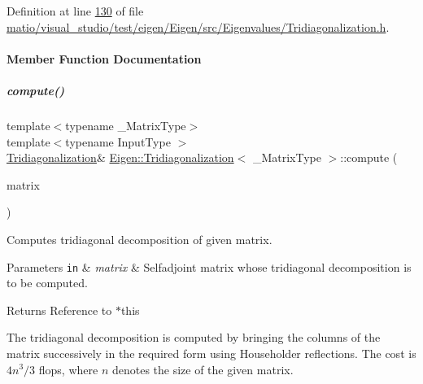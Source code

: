 Definition at line \hyperlink{matio_2visual__studio_2test_2eigen_2_eigen_2src_2_eigenvalues_2_tridiagonalization_8h_source_l00130}{130} of file \hyperlink{matio_2visual__studio_2test_2eigen_2_eigen_2src_2_eigenvalues_2_tridiagonalization_8h_source}{matio/visual\+\_\+studio/test/eigen/\+Eigen/src/\+Eigenvalues/\+Tridiagonalization.\+h}.



\paragraph{Member Function Documentation}
\mbox{\label{group___eigenvalues___module_acd288abb081d3b40b87e4b98cd8f6ee9}} 
\subparagraph{\texorpdfstring{compute()}{compute()}\hspace{0.1cm}{\footnotesize\ttfamily [1/2]}}
{\footnotesize\ttfamily template$<$typename \+\_\+\+Matrix\+Type$>$ \\
template$<$typename Input\+Type $>$ \\
\hyperlink{group___eigenvalues___module_class_eigen_1_1_tridiagonalization}{Tridiagonalization}\& \hyperlink{group___eigenvalues___module_class_eigen_1_1_tridiagonalization}{Eigen\+::\+Tridiagonalization}$<$ \+\_\+\+Matrix\+Type $>$\+::compute (\begin{DoxyParamCaption}\item[{const \hyperlink{group___core___module_struct_eigen_1_1_eigen_base}{Eigen\+Base}$<$ Input\+Type $>$ \&}]{matrix }\end{DoxyParamCaption})\hspace{0.3cm}{\ttfamily [inline]}}



Computes tridiagonal decomposition of given matrix. 


\begin{DoxyParams}[1]{Parameters}
\mbox{\tt in}  & {\em matrix} & Selfadjoint matrix whose tridiagonal decomposition is to be computed. \\
\hline
\end{DoxyParams}
\begin{DoxyReturn}{Returns}
Reference to {\ttfamily $\ast$this} 
\end{DoxyReturn}
The tridiagonal decomposition is computed by bringing the columns of the matrix successively in the required form using Householder reflections. The cost is $ 4n^3/3 $ flops, where $ n $ denotes the size of the given matrix.

